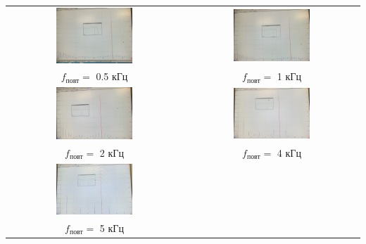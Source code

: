 \documentclass[a4paper,12pt]{article} %
\begin{document}
\hfill \break \begin{center}
\begin{tabular}{cc}
\includegraphics[width=0.45\textwidth]{14.jpg}&\includegraphics[width=0.45\textwidth]{15.jpg}\\
$f_\text{повт}=$ 0.5 кГц&$f_\text{повт}=$ 1 кГц\\
\includegraphics[width=0.45\textwidth]{16.jpg}&\includegraphics[width=0.45\textwidth]{17.jpg}\\
$f_\text{повт}=$ 2 кГц&$f_\text{повт}=$ 4 кГц\\
\includegraphics[width=0.45\textwidth]{18.jpg}\\
$f_\text{повт}=$ 5 кГц\\
\end{tabular}
\end{center}
\end{document}
